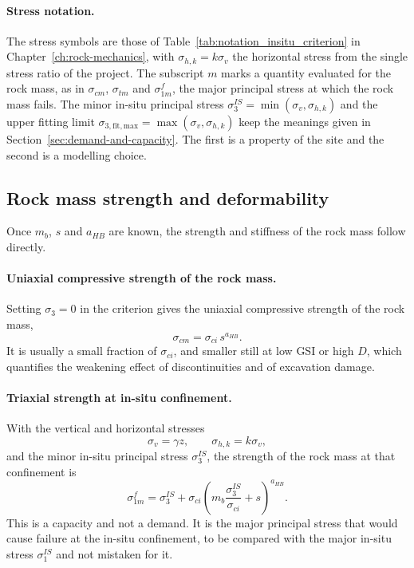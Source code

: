 \paragraph{Stress notation.}
The stress symbols are those of Table~\ref{tab:notation_insitu_criterion} in
Chapter~\ref{ch:rock-mechanics}, with \(\sigma_{h,k} = k\sigma_v\) the
horizontal stress from the single stress ratio of the project. The subscript
\(m\) marks a quantity evaluated for the rock mass, as in \(\sigma_{cm}\),
\(\sigma_{tm}\) and \(\sigma_{1m}^f\), the major principal stress at which the
rock mass fails. The minor in-situ principal stress
\(\sigma_3^{IS}=\min(\sigma_v,\sigma_{h,k})\) and the upper fitting limit
\(\sigma_{3,\mathrm{fit,max}}=\max(\sigma_v,\sigma_{h,k})\) keep the meanings
given in Section~\ref{sec:demand-and-capacity}. The first is a property of the
site and the second is a modelling choice.

\subsection{Rock mass strength and deformability}
\label{sec:rock-mass-strength-and-deformability}

Once \(m_b\), \(s\) and \(a_{HB}\) are known, the strength and stiffness of
the rock mass follow directly.

\paragraph{Uniaxial compressive strength of the rock mass.}
Setting \(\sigma_3=0\) in the criterion gives the uniaxial compressive
strength of the rock mass,
\[
\sigma_{cm}
=
\sigma_{ci}\,s^{a_{HB}} .
\]
It is usually a small fraction of \(\sigma_{ci}\), and smaller still at low
GSI or high \(D\), which quantifies the weakening effect of discontinuities
and of excavation damage.

\paragraph{Triaxial strength at in-situ confinement.}
With the vertical and horizontal stresses
\[
\sigma_v = \gamma z ,
\qquad
\sigma_{h,k}=k\sigma_v ,
\]
and the minor in-situ principal stress \(\sigma_3^{IS}\), the
strength of the rock mass at that confinement is
\[
\sigma_{1m}^f =
\sigma_3^{IS}
+
\sigma_{ci}
\left(
m_b\frac{\sigma_3^{IS}}{\sigma_{ci}} + s
\right)^{a_{HB}} .
\]
This is a capacity and not a demand. It is the major principal stress that
would cause failure at the in-situ confinement, to be compared with the major
in-situ stress \(\sigma_1^{IS}\) and not mistaken for it.

